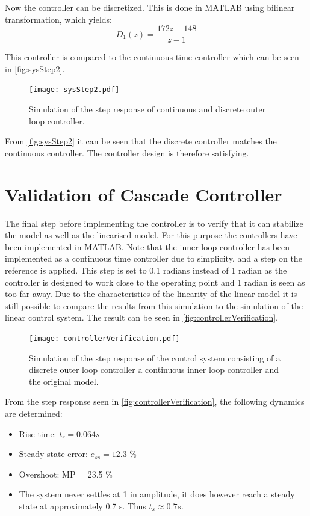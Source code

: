 Now the controller can be discretized. This is done in MATLAB using bilinear transformation, which yields:
\begin{equation}
D_1(z) = \frac{172 z - 148}{z - 1}
\label{origControllerDiscrete}
\end{equation}

This controller is compared to the continuous time controller which can be seen in \autoref{fig:sysStep2}. 

\begin{figure}[H]
\centering
\texttt{[image: sysStep2.pdf]}
\caption{Simulation of the step response of continuous and discrete outer loop controller.}
\label{fig:sysStep2}
\end{figure}

From \autoref{fig:sysStep2} it can be seen that the discrete controller matches the continuous controller. The controller design is therefore satisfying.

\section{Validation of Cascade Controller}
The final step before implementing the controller is to verify that it can stabilize the model as well as the linearised model. For this purpose the controllers have been implemented in MATLAB. Note that the inner loop controller has been implemented as a continuous time controller due to simplicity, and a step on the reference is applied. This step is set to 0.1 radians instead of 1 radian as the controller is designed to work close to the operating point and 1 radian is seen as too far away. Due to the characteristics of the linearity of the linear model it is still possible to compare the results from this simulation to the simulation of the linear control system. The result can be seen in \autoref{fig:controllerVerification}. 
\vspace{-0.75 cm}
\begin{figure}[H]
\centering
\texttt{[image: controllerVerification.pdf]}
\caption{Simulation of the step response of the control system consisting of a discrete outer loop controller a continuous inner loop controller and the original model.}
\label{fig:controllerVerification}
\end{figure}
From the step response seen in \autoref{fig:controllerVerification}, the following dynamics are determined:
\begin{itemize}
\item Rise time: $t_r = 0.064 s$
\item Steady-state error: $e_{ss} = 12.3$ \%
\item Overshoot: MP = 23.5 \%
\item The system never settles at 1 in amplitude, it does however reach a steady state at approximately 0.7 s. Thus $t_s \approx 0.7 s$.
\end{itemize} 

